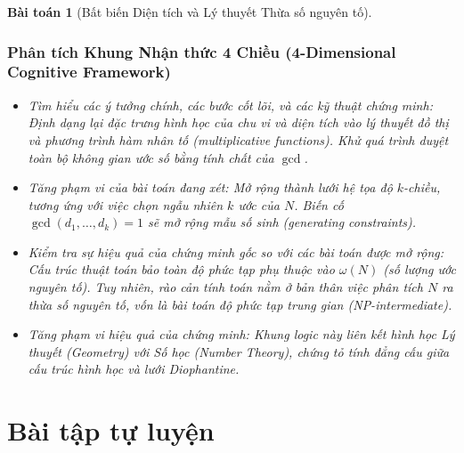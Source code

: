 \documentclass{article}
\newtheorem{baitoan}{Bài toán}
\begin{document}
\begin{baitoan}[Bất biến Diện tích và Lý thuyết Thừa số nguyên tố]
  \subsubsection*{Phân tích Khung Nhận thức 4 Chiều (4-Dimensional Cognitive Framework)}
 \begin{itemize}
 \item \textit{Tìm hiểu các ý tưởng chính, các bước cốt lõi, và các kỹ thuật chứng minh}: Định dạng lại đặc trưng hình học của chu vi và diện tích vào lý thuyết đồ thị và phương trình hàm nhân tố (multiplicative functions). Khử quá trình duyệt toàn bộ không gian ước số bằng tính chất của $\gcd$.
 \item \textit{Tăng phạm vi của bài toán đang xét}: Mở rộng thành lưới hệ tọa độ $k$-chiều, tương ứng với việc chọn ngẫu nhiên $k$ ước của $N$. Biến cố $\gcd(d_1, \dots, d_k) = 1$ sẽ mở rộng mẫu số sinh (generating constraints).
 \item \textit{Kiểm tra sự hiệu quả của chứng minh gốc so với các bài toán được mở rộng}: Cấu trúc thuật toán bảo toàn độ phức tạp phụ thuộc vào $\omega(N)$ (số lượng ước nguyên tố). Tuy nhiên, rào cản tính toán nằm ở bản thân việc phân tích $N$ ra thừa số nguyên tố, vốn là bài toán độ phức tạp trung gian (NP-intermediate).
 \item \textit{Tăng phạm vi hiệu quả của chứng minh}: Khung logic này liên kết hình học Lý thuyết (Geometry) với Số học (Number Theory), chứng tỏ tính đẳng cấu giữa cấu trúc hình học và lưới Diophantine.
 \end{itemize}
\end{baitoan}



\section{Bài tập tự luyện}
\end{document}
